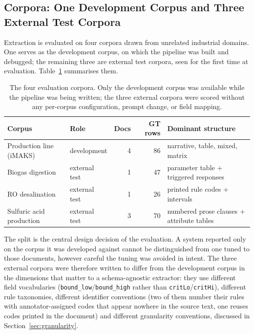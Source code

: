 \documentclass[11pt]{article}
\begin{document}
\subsection{Corpora: One Development Corpus and Three External Test Corpora}
\label{sec:benchmark}

Extraction is evaluated on four corpora drawn from unrelated industrial domains.
One serves as the development corpus, on which the pipeline was built and
debugged; the remaining three are external test corpora, seen for the first time
at evaluation. Table~\ref{tab:corpora} summarises them.

\begin{table}[H]
\centering
\caption{The four evaluation corpora. Only the development corpus was available
while the pipeline was being written; the three external corpora were scored
without any per-corpus configuration, prompt change, or field mapping.}
\label{tab:corpora}
\small
\begin{tabular}{llrrl}
\toprule
\textbf{Corpus} & \textbf{Role} & \textbf{Docs} & \textbf{GT rows} & \textbf{Dominant structure} \\
\midrule
Production line (iMAKS)   & development   & 4 & 86 & narrative, table, mixed, matrix \\
Biogas digestion          & external test & 1 & 47 & parameter table + triggered responses \\
RO desalination           & external test & 1 & 26 & printed rule codes + intervals \\
Sulfuric acid production  & external test & 3 & 70 & numbered prose clauses + attribute tables \\
\bottomrule
\end{tabular}
\end{table}

The split is the central design decision of the evaluation. A system reported
only on the corpus it was developed against cannot be distinguished from one
tuned to those documents, however careful the tuning was avoided in intent. The
three external corpora were therefore written to differ from the development
corpus in the dimensions that matter to a schema-agnostic extractor: they use
different field vocabularies (\texttt{bound\_low}/\texttt{bound\_high} rather
than \texttt{critLo}/\texttt{critHi}), different rule taxonomies, different
identifier conventions (two of them number their rules with annotator-assigned
codes that appear nowhere in the source text, one reuses codes printed in the
document) and different granularity conventions, discussed in
Section~\ref{sec:granularity}.
\end{document}
